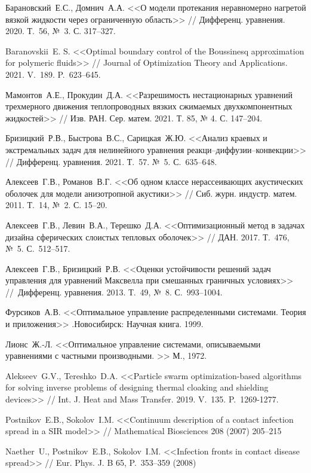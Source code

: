 \begin{thebibliography}{1}
	 Барановский~Е.С., Домнич~А.А. <<О модели протекания неравномерно нагретой вязкой жидкости через ограниченную область>> //  Дифференц. уравнения. 2020. Т.~56, №~3. С. 317--327.

	 Baranovskii~E. S. <<Optimal boundary control of the Boussinesq approximation for polymeric fluids>> // Journal of Optimization Theory and Applications. 2021. V.~189. P.~623--645.

	 Мамонтов~А.Е., Прокудин~Д.А. <<Разрешимость нестационарных уравнений трехмерного движения теплопроводных вязких сжимаемых двухкомпонентных жидкостей>> // Изв. РАН. Сер. матем. 2021.  Т. 85, № 4. С. 147--204.

	 Бризицкий~Р.В., Быстрова~В.С., Сарицкая~Ж.Ю. <<Анализ краевых и экстремальных задач для нелинейного уравнения реакци--диффузии--конвекции>> //  Дифференц. уравнения. 2021. Т.~57. №~5. С.~635--648.

	 Алексеев~Г.В., Романов~В.Г. <<Об одном классе нерассеивающих акустических оболочек для модели анизотропной акустики>> // Сиб. журн. индустр. матем. 2011. Т.~14, №~2. С. 15--20.

	 Алексеев~Г.В., Левин~В.А., Терешко~Д.А. <<Оптимизационный метод в задачах дизайна сферических слоистых тепловых оболочек>> // ДАН. 2017. Т.~476, №~5. С.~512--517.

	 Алексеев~Г.В., Бризицкий~Р.В. <<Оценки устойчивости решений задач управления для уравнений Максвелла при смешанных граничных условиях>> //~Дифференц. уравнения. 2013. Т.~49, №~8. С.~993--1004.

	 Фурсиков~А.В. <<Оптимальное управление распределенными системами. Теория и приложения>> .Новосибирск: Научная книга. 1999.

	 Лионс~Ж.-Л. <<Оптимальное управление системами, описываемыми уравнениями с частными производными. >> М., 1972.

	 Alekseev~G.V., Tereshko~D.A. <<Particle swarm optimization-based algorithms for solving inverse problems of designing thermal cloaking and shielding devices>> // Int. J. Heat and Mass Transfer. 2019. V.~135. P.~1269-1277.

	 Postnikov~E.B., Sokolov~I.M. <<Continuum description of a contact infection spread in a SIR model>> // Mathematical Biosciences 208 (2007) 205–215

	 Naether~U., Postnikov~E.B., Sokolov~I.M. <<Infection fronts in contact disease spread>> // Eur. Phys. J. B 65, P.~353–359 (2008)

\end{thebibliography}

